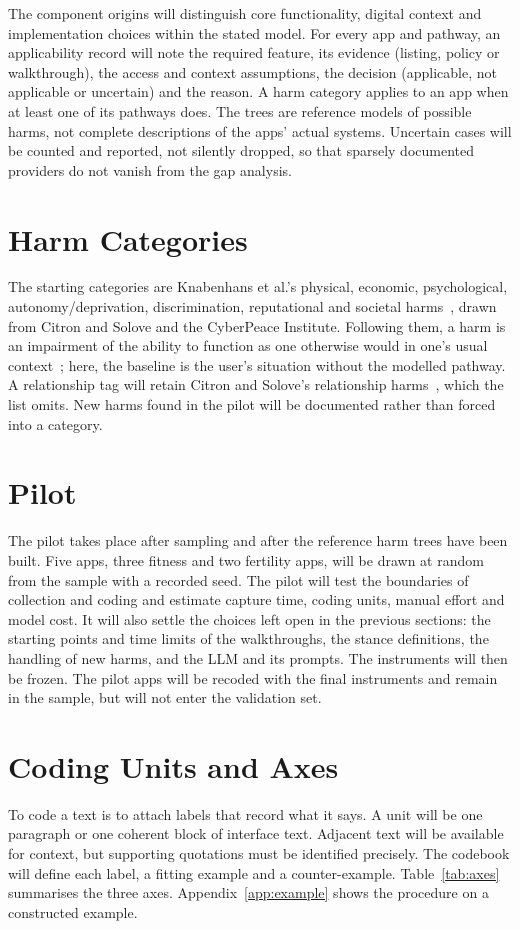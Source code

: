 \documentclass[twoside,its]{bossthesis}
\begin{document}
The component origins will distinguish core functionality, digital context
and implementation choices within the stated model. For every app and
pathway, an applicability record will note the required feature, its
evidence (listing, policy or walkthrough), the access and context
assumptions, the decision (applicable, not applicable or uncertain) and the
reason. A harm category applies to an app when at least one of its pathways
does. The trees are reference models of possible harms, not complete
descriptions of the apps' actual systems. Uncertain cases will be counted and
reported, not silently dropped, so that sparsely documented providers do not
vanish from the gap analysis.

\section{Harm Categories} The starting categories are Knabenhans et al.'s
physical, economic, psychological, autonomy/\allowbreak deprivation, discrimination,
reputational and societal harms~\parencite[App.~A]{knabenhans2026harms},
drawn from Citron and Solove and the CyberPeace Institute. Following them, a
harm is an impairment of the ability to function as one otherwise would in
one's usual context~\parencite[\S4.1]{knabenhans2026harms}; here, the baseline
is the user's situation without the modelled pathway. A relationship tag will
retain Citron and Solove's relationship harms~\parencite{citron2021harms},
which the list omits. New harms found in the pilot will be documented rather
than forced into a category.


\section{Pilot} The pilot takes place after sampling and after the reference
harm trees have been built. Five apps, three fitness and two fertility apps,
will be drawn at random from the sample with a recorded seed. The pilot will
test the boundaries of collection and coding and estimate capture time, coding
units, manual effort and model cost. It will also settle the choices left open
in the previous sections: the starting points and time limits of the
walkthroughs, the stance definitions, the handling of new harms, and the LLM
and its prompts. The instruments will then be frozen. The pilot apps will be
recoded with the final instruments and remain in the sample, but will not
enter the validation set.

\section{Coding Units and Axes} To code a text is to attach labels that
record what it says. A unit will be one paragraph or one coherent block of
interface text. Adjacent text will be available for context, but supporting quotations must
be identified precisely. The codebook will define each label, a fitting
example and a counter-example. Table~\ref{tab:axes} summarises the three axes.
Appendix~\ref{app:example} shows the procedure on a constructed example.
\end{document}
